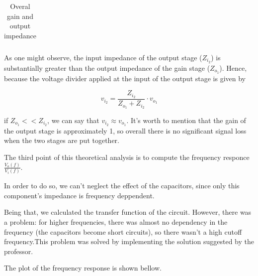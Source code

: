 \begin{table}[H]
	\centering
	\begin{tabularx}{0.9\textwidth} {
 	    | >{\raggedright\arraybackslash}X
  	    | >{\raggedleft\arraybackslash}X | }
	\hline
	
	\end{tabularx}
	\caption{Overal gain and output impedance}
	\label{tab:overall}
\end{table}
\vspace{5mm}

\par As one might observe, the input impedance of the output stage ($Z_{i_2}$) is substantially greater than the output impedance of the gain stage ($Z_{o_1}$). Hence, because the voltage divider applied at the input of the output stage is given by

\begin{equation}
	v_{i_2}= \frac{Z_{i_2}}{Z_{o_1}+Z_{i_2}} \cdot v_{o_1}
\end{equation}

\noindent if $Z_{o_1}<<Z_{i_2}$, we can say that $v_{i_2} \approx v_{o_1}$. It's worth to mention that the gain of the output stage is approximately 1, so overall there is no significant signal loss when the two stages are put together.

\par The third point of this theoretical analysis is to compute the frequency responce $\frac{V_o(f)}{V_i(f)}$. 
\par In order to do so, we can't neglect the effect of the capacitors, since only this component's impedance is frequency deppendent.
\par Being that, we calculated the transfer function of the circuit. However, there was a problem: for higher frequencies, there was almost no dependency in the frequency (the capacitors become short circuits), so there wasn't a high cutoff frequency.This problem was solved by implementing the solution suggested by the professor.
\par The plot of the frequency response is shown bellow.

